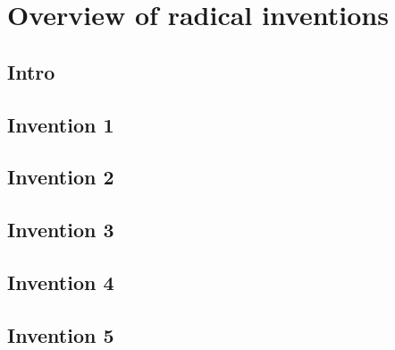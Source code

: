 \chapter{Overview of radical inventions}\label{chap:inventions}

\section{Intro}

\section{Invention 1}

\section{Invention 2}

\section{Invention 3}

\section{Invention 4}

\section{Invention 5}